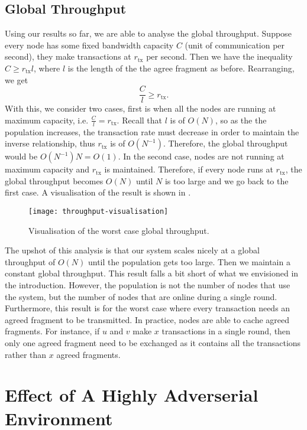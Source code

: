 \subsection{Global Throughput}
Using our results so far, we are able to analyse the global throughput.
Suppose every node has some fixed bandwidth capacity $C$ (unit of communication per second),
they make transactions at $r_{\text{tx}}$ per second.
Then we have the inequality $C \ge r_{\text{tx}} l$, where $l$ is the length of the the agree fragment as before.
Rearranging, we get
$$\frac{C}{l} \ge r_{\text{tx}}.$$
With this, we consider two cases, first is  when all the nodes are running at maximum capacity, i.e. $\frac{C}{l} = r_{\text{tx}}$.
Recall that $l$ is of $O(N)$, so as the the population increases, 
the transaction rate must decrease in order to maintain the inverse relationship,
thus $r_\text{tx}$ is of $O(N^{-1})$. %
Therefore, the global throughput would be $O(N^{-1})N = O(1)$.
In the second case, nodes are not running at maximum capacity and $r_{\text{tx}}$ is maintained.
Therefore, if every node runs at $r_{\text{tx}}$,
the global throughput becomes $O(N)$ until $N$ is too large and we go back to the first case.
A visualisation of the result is shown in .

\begin{figure}[h]
  \centering
  \texttt{[image: throughput-visualisation]}
  \caption{Visualisation of the worst case global throughput.}
  \label{fig:throughput-visualisation}
\end{figure}

The upshot of this analysis is that our system scales nicely at a global throughput of $O(N)$ until the population gets too large.
Then we maintain a constant global throughput.
This result falls a bit short of what we envisioned in the introduction.
However, the population is not the number of nodes that use the system, but the number of nodes that are online during a single round.
Furthermore, this result is for the worst case where every transaction needs an agreed fragment to be transmitted.
In practice, nodes are able to cache agreed fragments.
For instance, if $u$ and $v$ make $x$ transactions in a single round,
then only one agreed fragment need to be exchanged as it contains all the transactions rather than $x$ agreed fragments.

\section{Effect of A Highly Adverserial Environment}

